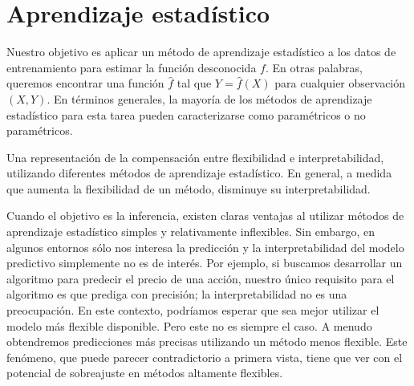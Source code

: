 \setcounter{chapter}{1}
\chapter{Aprendizaje estadístico}

Nuestro objetivo es aplicar un método de aprendizaje estadístico a los datos de entrenamiento para estimar la función desconocida $f$. En otras palabras, queremos encontrar una función $\hat{f}$ tal que $Y = \hat{f}(X)$ para cualquier observación $(X,Y)$. En términos generales, la mayoría de los métodos de aprendizaje estadístico para esta tarea pueden caracterizarse como paramétricos o no paramétricos.


\begin{center}

    \small Una representación de la compensación entre flexibilidad e interpretabilidad, utilizando diferentes métodos de aprendizaje estadístico. En general, a medida que aumenta la flexibilidad de un método, disminuye su interpretabilidad.
\end{center}

Cuando el objetivo es la inferencia, existen claras ventajas al utilizar métodos de aprendizaje estadístico simples y relativamente inflexibles. Sin embargo, en algunos entornos sólo nos interesa la predicción y la interpretabilidad del modelo predictivo simplemente no es de interés. Por ejemplo, si buscamos desarrollar un algoritmo para predecir el precio de una acción, nuestro único requisito para el algoritmo es que prediga con precisión; la interpretabilidad no es una preocupación. En este contexto, podríamos esperar que sea mejor utilizar el modelo más flexible disponible. Pero este no es siempre el caso. A menudo obtendremos predicciones más precisas utilizando un método menos flexible. Este fenómeno, que puede parecer contradictorio a primera vista, tiene que ver con el potencial de sobreajuste en métodos altamente flexibles. \\

